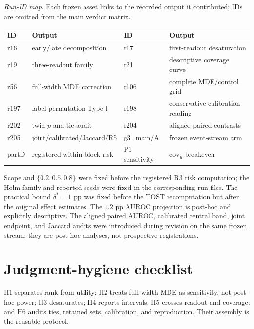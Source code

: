 \documentclass{article}
\begin{document}
\begin{table}[ht]
\smallskip
\emph{Run-ID map.} Each frozen asset links to the recorded output it contributed; IDs are
omitted from the main verdict matrix.
\begin{tabularx}{\textwidth}{@{}l>{\raggedright\arraybackslash}X l>{\raggedright\arraybackslash}X@{}}
\toprule
ID & Output & ID & Output \\
\midrule
r16 & early/late decomposition & r17 & first-readout desaturation \\
r19 & three-readout family & r21 & descriptive coverage curve \\
r56 & full-width MDE correction & r106 & complete MDE/control grid \\
r197 & label-permutation Type-I & r198 & conservative calibration reading \\
r202 & twin-$p$ and tie audit & r204 & aligned paired contrasts \\
r205 & joint/calibrated/Jaccard/R5 & g3\_main/A & frozen event-stream arm \\
partD & registered within-block risk & P1 sensitivity & $\mathrm{cov}_u$ breakeven \\
\bottomrule
\end{tabularx}
\end{table}

Scope and $\{0.2,0.5,0.8\}$ were fixed before the registered R3 risk computation; the Holm
family and reported seeds were fixed in the corresponding run files.  The practical bound
$\delta^*=1$ pp was fixed before the TOST recomputation but after the original effect estimates.
The $1.2$ pp AUROC projection is post-hoc and explicitly descriptive.  The aligned paired AUROC,
calibrated central band, joint endpoint, and Jaccard audits were introduced during revision on
the same frozen stream; they are post-hoc analyses, not prospective registrations.

\section{Judgment-hygiene checklist}
\label{app:hygiene}

H1 separates rank from utility; H2 treats full-width MDE as sensitivity, not post-hoc power;
H3 desaturates; H4 reports intervals; H5 crosses readout and coverage; and H6 audits ties,
retained sets, calibration, and reproduction.  Their assembly is the reusable protocol.
\end{document}
